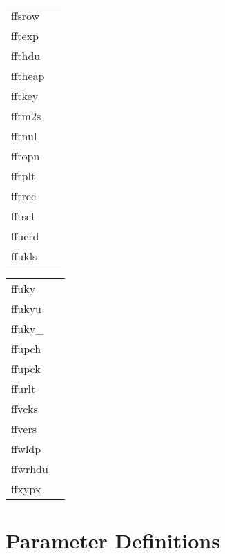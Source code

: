 \documentclass[11pt]{book}
\begin{document}
\begin{tabular}{lr}
ffsrow  & \pageref{ffsrow} \\
fftexp    & \pageref{fftexp} \\
ffthdu   & \pageref{ffthdu} \\
fftheap  & \pageref{fftheap} \\
fftkey   & \pageref{fftkey} \\
fftm2s  & \pageref{ffdt2s} \\
fftnul   & \pageref{fftnul} \\
fftopn & \pageref{ffopen} \\
fftplt & \pageref{fftplt} \\
fftrec    & \pageref{fftrec} \\
fftscl     & \pageref{fftscl} \\
ffucrd       & \pageref{ffucrd} \\
ffukls    & \pageref{ffukyx} \\


\end{tabular}
\newpage
\begin{tabular}{lr}

ffuky        & \pageref{ffuky} \\
ffukyu   & \pageref{ffukyu} \\
ffuky\_    & \pageref{ffukyx} \\
ffupch      & \pageref{ffupch} \\
ffupck  & \pageref{ffupck} \\
ffurlt  & \pageref{ffurlt} \\
ffvcks  & \pageref{ffvcks} \\
ffvers    & \pageref{ffvers} \\
ffwldp & \pageref{ffwldp} \\
ffwrhdu  & \pageref{ffwrhdu} \\
ffxypx & \pageref{ffxypx} \\

\end{tabular}


\chapter{Parameter Definitions }
\end{document}
